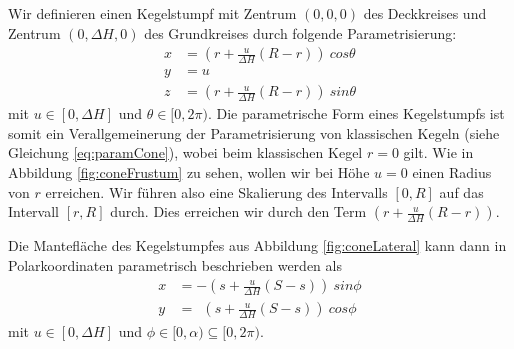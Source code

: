 Wir definieren einen Kegelstumpf mit Zentrum $(0,0,0)$ des Deckkreises und Zentrum $(0,\Delta H, 0)$ des Grundkreises durch folgende Parametrisierung: 
\begin{equation} \label{eq:paramFrustum}
\begin{aligned}
x &= (r + \frac{u}{\Delta H} (R - r))~cos \theta \\
y &= u \\
z &= (r + \frac{u}{\Delta H} (R - r))~sin \theta
\end{aligned}
\end{equation}
mit $u\in [0, \Delta H]$ und $\theta \in [0, 2\pi)$. Die parametrische Form eines Kegelstumpfs ist somit ein Verallgemeinerung der Parametrisierung von klassischen Kegeln (siehe Gleichung \ref{eq:paramCone}), wobei beim klassischen Kegel $r = 0$ gilt. Wie in Abbildung \ref{fig:coneFrustum} zu sehen, wollen wir bei Höhe $u=0$ einen Radius von $r$ erreichen. Wir führen also eine Skalierung des Intervalls $[0, R]$ auf das Intervall $[r, R]$ durch. Dies erreichen wir durch den Term $(r + \frac{u}{\Delta H} (R - r))$. \bigskip



Die Mantefläche des Kegelstumpfes aus Abbildung \ref{fig:coneLateral} kann dann in Polarkoordinaten parametrisch beschrieben werden als
\begin{equation} \label{eq:paramLateral}
\begin{aligned}
x &= -(s + \frac{u}{\Delta H}(S-s)) ~sin \phi \\
y &= ~~(s + \frac{u}{\Delta H} (S-s)) ~cos \phi
\end{aligned}
\end{equation}
mit  $u\in [0, \Delta H]$ und $\phi \in [0, \alpha) \subseteq [0, 2\pi)$. 

